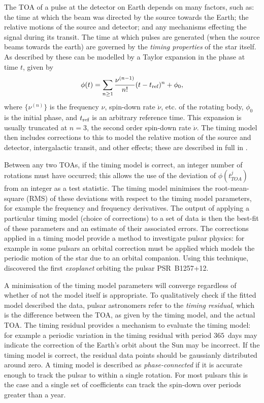 The TOA of a pulse at the detector on Earth depends on many factors, such as: the
time at which the beam was directed by the source towards the Earth; the relative
motions of the source and detector; and any mechanisms effecting the signal during
its transit. The time at which pulses are generated (when the source beams towards
the earth) are governed by the \emph{timing properties} of the star itself.
As described by \citet{Edwards2006} these can be modelled by a Taylor expansion
in the phase at time $t$, given by
\begin{equation}
\phi(t) = \sum_{n\ge 1}\frac{\nu^{(n-1)}}{n!}(t - t_{\textrm{ref}})^{n} + \phi_{0},
\label{eqn: Taylor compact}
\end{equation} 
where $\{\nu^{(n)}\}$ is the frequency $\nu$, spin-down rate $\dot{\nu}$, etc.
of the rotating body, $\phi_0$ is the initial phase, and $t_{\textrm{ref}}$ is an
arbitrary reference time. This expansion is usually truncated at $n=3$, the
second order spin-down rate $\ddot{\nu}$. The timing model then includes
corrections to this to model the relative motion of the source and detector,
intergalactic transit, and other effects; these are described in full in
\citet{Edwards2006}. 

Between any two TOAs, if the timing model is correct, an integer number of
rotations must have occurred; this allows the use of the deviation of
$\phi(t_{TOA}^{j})$ from an integer as a test statistic. The timing model
minimises the root-mean-square (RMS) of these deviations with respect to the timing model
parameters, for example the frequency and frequency derivatives. The output of
applying a particular timing model (choice of corrections) to a set of data is
then the best-fit of these parameters and an estimate of their associated
errors.  The corrections applied in a timing model provide a method to
investigate pulsar physics: for example in some pulsars an orbital correction
must be applied which models the periodic motion of the star due to an orbital
companion. Using this technique, \citet{wolszczan1992planetary} discovered the
first \emph{exoplanet} orbiting the pulsar PSR~B1257+12.

A minimisation of the timing model parameters will converge regardless of
whether of not the model itself is appropriate. To qualitatively check if the
fitted model described the data, pulsar astronomers refer to the \emph{timing
residual}, which is the difference between the TOA, as given by the timing
model, and the actual TOA. The timing residual provides a mechanism to evaluate
the timing model: for example a periodic variation in the timing residual with period
$365$~days may indicate the correction of the Earth's orbit about the Sun may
be incorrect. If the timing model is correct, the residual data points should
be gaussianly distributed around zero. A timing model is described as
\emph{phase-connected} if it is accurate enough to track the pulsar to within a
single rotation. For most pulsars this is the case and a single set of
coefficients can track the spin-down over periods greater than a year.

